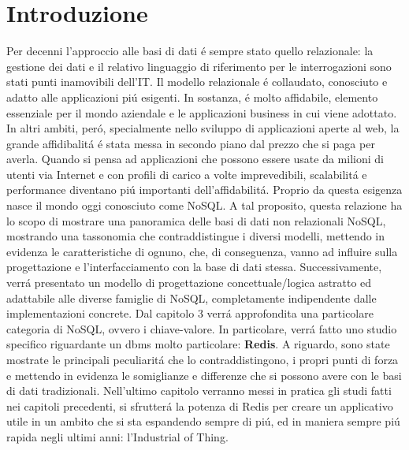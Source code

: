 \chapter*{Introduzione}
Per decenni l'approccio alle basi di dati é sempre stato quello relazionale: la gestione dei dati e il relativo
linguaggio di riferimento per le interrogazioni sono stati punti inamovibili dell'IT.
Il modello relazionale é collaudato, conosciuto e adatto alle applicazioni piú esigenti. In sostanza, é molto
affidabile, elemento essenziale per il mondo aziendale e le applicazioni business in cui viene adottato.
In altri ambiti, peró, specialmente nello sviluppo di applicazioni aperte al web, la grande affidibalitá é stata
messa in secondo piano dal prezzo che si paga per averla. Quando si pensa ad applicazioni che possono essere
usate da milioni di utenti via Internet e con profili di carico a volte imprevedibili, scalabilitá e performance
diventano piú importanti dell'affidabilitá. Proprio da questa esigenza nasce il mondo oggi conosciuto come NoSQL.
A tal proposito, questa relazione ha lo scopo di mostrare una panoramica delle basi di dati non relazionali NoSQL,
mostrando una tassonomia che contraddistingue i diversi modelli, mettendo in evidenza le caratteristiche di ognuno,
che, di conseguenza, vanno ad influire sulla progettazione e l'interfacciamento con la base di dati stessa.
Successivamente, verrá presentato un modello di progettazione concettuale/logica
astratto ed adattabile alle diverse famiglie di NoSQL, completamente indipendente dalle implementazioni concrete.
Dal capitolo 3 verrá approfondita una particolare categoria di NoSQL, ovvero i chiave-valore. In particolare,
verrá fatto uno studio specifico riguardante un dbms molto particolare: \textbf{Redis}.
A riguardo, sono state mostrate le principali peculiaritá che lo contraddistingono, i propri punti di forza e
mettendo in evidenza le somiglianze e differenze che si possono avere con le basi di dati tradizionali.
Nell'ultimo capitolo verranno messi in pratica gli studi fatti nei capitoli precedenti, si sfrutterá
la potenza di Redis per creare un applicativo utile in un ambito che si sta espandendo sempre di piú, ed in maniera sempre piú rapida
negli ultimi anni: l'Industrial of Thing.
